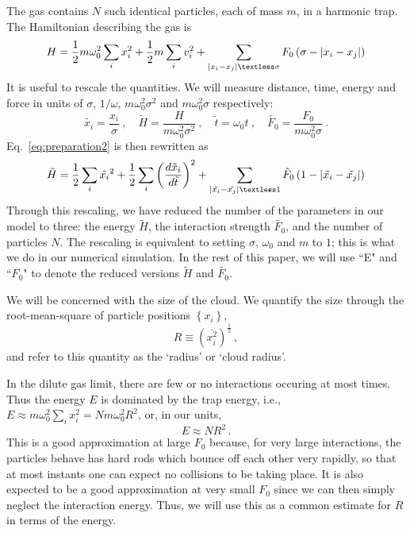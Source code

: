 \documentclass[aps,preprintnumbers,onecolumn,amsmath,amssymb,floatfix,pra]{revtex4-1}
\begin{document}
The gas contains $N$ such identical particles, each of mass $m$, in a harmonic trap.  The
Hamiltonian describing the gas is 
\begin{equation}
H=\frac{1}{2}m\omega_0^2\sum_{i}x_i^2+\frac{1}{2}m\sum_i
v_i^2+\sum_{\left|x_i-x_j\right|\textless\sigma}F_0\left(\sigma-\left|x_i-x_j\right|\right)
\label{eq:preparation2}
\end{equation}
%
It is useful to rescale the quantities.  We will measure distance, time, energy and force in units
of $\sigma$, $1/\omega$, $m\omega_0^2\sigma^2$ and $m\omega_0^2\sigma$ respectively:
\begin{equation} \label{eq:transform}
  \tilde{x_i} = \frac{x_i}{\sigma}\ , \quad 
  \tilde{H} = \frac{H}{m\omega_0^2\sigma^2}\ ,  \quad \tilde{t} = \omega_0t \ ,  \quad 
\tilde{F_0} = \frac{F_0}{m\omega_0^2\sigma}\ .
\end{equation}
%
Eq.~\ref{eq:preparation2} is then rewritten as
\begin{equation}
  \tilde{H} =
  \frac{1}{2}\sum_{i}\tilde{x_i}^2
  + \frac{1}{2}\sum_i\left(\frac{d\tilde{x}_i}{d\tilde{t}}\right)^2 
  + \sum_{\left|\tilde{x_i}-\tilde{x_j}\right|\textless
    1}\tilde{F}_0\left(1-\left|\tilde{x_i}-\tilde{x_j}\right|\right)  
\end{equation}
%
Through this rescaling, we have reduced the number of the parameters in our model to three: the
energy $\tilde{H}$, the interaction strength $\tilde{F_0}$, and the number of particles $N$.  The
rescaling is equivalent to setting $\sigma$, $\omega_0$ and $m$ to $1$; this is what we do in our
numerical simulation.  In the rest of this paper, we will use ``E" and ``$F_0$" to denote the
reduced versions $\tilde{H}$ and $\tilde{F_0}$.

We will be concerned with the size of the cloud.  We quantify the size through the root-mean-square
of particle positions $\left\lbrace x_i\right\rbrace$, 
\begin{equation}
R\equiv\left(\overline{x_i^2}\right)^\frac{1}{2} \, ,
\label{eq:def_of_R}
\end{equation}
and refer to this quantity as the `radius' or `cloud radius'.

In the dilute gas limit, there are few or no interactions occuring at most times.  Thus the energy
$E$ is dominated by the trap energy, i.e., $E\approx m\omega_0^2\sum_{i}x_i^2= Nm\omega_0^2R^2$, or,
in our units,
\begin{equation}
  E\approx NR^2 \, .
  \label{eq:E_and_R}
\end{equation}
This is a good approximation at large $F_0$ because, for very large interactions, the particles
behave has hard rods which bounce off each other very rapidly, so that at most instants one can
expect no collisions to be taking place.  It is also expected to be a good approximation at very
small $F_0$ since we can then simply neglect the interaction energy.  Thus, we will use this as a common
estimate for $R$ in terms of the energy. 
\end{document}
